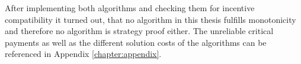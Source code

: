 After implementing both algorithms \cite{githublink} and checking them for incentive compatibility it turned out, that no algorithm in this thesis fulfills monotonicity and therefore no algorithm is strategy proof either. The unreliable critical payments as well as the different solution costs of the algorithms can be referenced in Appendix \ref{chapter:appendix}. 